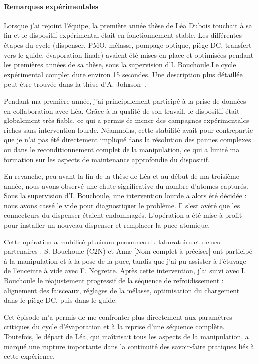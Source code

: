 \paragraph{Remarques expérimentales}
Lorsque j’ai rejoint l’équipe, la première année thèse de Léa Dubois touchait à sa fin et le dispositif expérimental était en fonctionnement stable. Les différentes étapes du cycle (dispenser, PMO, mélasse, pompage optique, piège DC, transfert vers le guide, évaporation finale) avaient été mises en place et optimisées pendant les premières années de sa thèse, sous la supervision d’I. Bouchoule.Le cycle expérimental complet dure environ 15 secondes. Une description plus détaillée peut être trouvée dans la thèse d’A. Johnson~\cite{Johnson2016}.


Pendant ma première année, j’ai principalement participé à la prise de données en collaboration avec Léa. Grâce à la qualité de son travail, le dispositif était globalement très fiable, ce qui a permis de mener des campagnes expérimentales riches sans intervention lourde. Néanmoins, cette stabilité avait pour contrepartie que je n’ai pas été directement impliqué dans la résolution des pannes complexes ou dans le reconditionnement complet de la manipulation, ce qui a limité ma formation sur les aspects de maintenance approfondie du dispositif.

En revanche, peu avant la fin de la thèse de Léa et au début de ma troisième année, nous avons observé une chute significative du nombre d’atomes capturés. Sous la supervision d’I. Bouchoule, une intervention lourde a alors été décidée : nous avons cassé le vide pour diagnostiquer le problème. Il s’est avéré que les connecteurs du dispenser étaient endommagés. L’opération a été mise à profit pour installer un nouveau dispenser et remplacer la puce atomique.

Cette opération a mobilisé plusieurs personnes du laboratoire et de ses partenaires : S. Bouchoule (C2N) et Anne [Nom complet à préciser] ont participé à la manipulation et à la pose de la puce, tandis que j’ai pu assister à l’étuvage de l’enceinte à vide avec F. Nogrette. Après cette intervention, j’ai suivi avec I. Bouchoule le réajustement progressif de la séquence de refroidissement : alignement des faisceaux, réglages de la mélasse, optimisation du chargement dans le piège DC, puis dans le guide.

Cet épisode m’a permis de me confronter plus directement aux paramètres critiques du cycle d’évaporation et à la reprise d’une séquence complète. Toutefois, le départ de Léa, qui maîtrisait tous les aspects de la manipulation, a marqué une rupture importante dans la continuité des savoir-faire pratiques liés à cette expérience.



